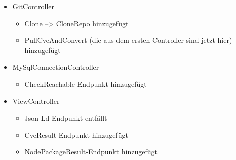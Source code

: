 \begin{itemize}
        \item GitController \label{api_controller:one}
            \begin{itemize}
                \item Clone --> CloneRepo hinzugefügt
                \item PullCveAndConvert (die aus dem ersten Controller sind jetzt hier) hinzugefügt
            \end{itemize}
        \item MySqlConnectionController \label{api_controller_2:five}
            \begin{itemize}
                \item CheckReachable-Endpunkt hinzugefügt
            \end{itemize}
        \item ViewController \label{api_controller:four}
            \begin{itemize}
                \item Json-Ld-Endpunkt entfällt
                \item CveResult-Endpunkt hinzugefügt
                \item NodePackageResult-Endpunkt hinzugefügt
            \end{itemize}
           
    \end{itemize}